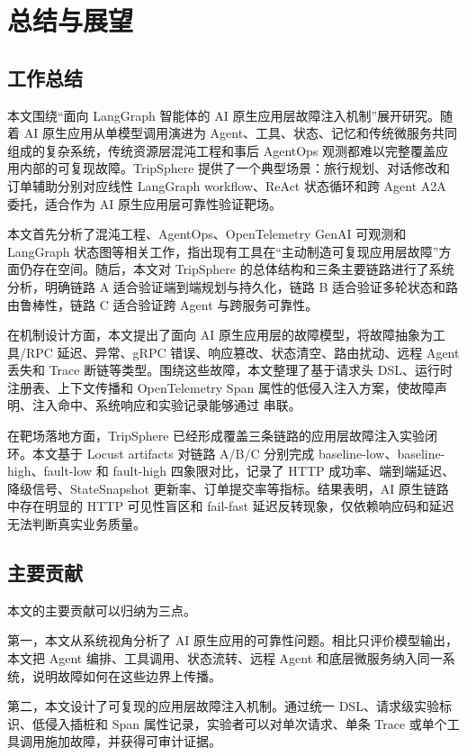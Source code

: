 \chapter{总结与展望}

\section{工作总结}

本文围绕“面向 LangGraph 智能体的 AI 原生应用层故障注入机制”展开研究。随着 AI 原生应用从单模型调用演进为 Agent、工具、状态、记忆和传统微服务共同组成的复杂系统，传统资源层混沌工程和事后 AgentOps 观测都难以完整覆盖应用内部的可复现故障。TripSphere 提供了一个典型场景：旅行规划、对话修改和订单辅助分别对应线性 LangGraph workflow、ReAct 状态循环和跨 Agent A2A 委托，适合作为 AI 原生应用层可靠性验证靶场。

本文首先分析了混沌工程、AgentOps、OpenTelemetry GenAI 可观测和 LangGraph 状态图等相关工作，指出现有工具在“主动制造可复现应用层故障”方面仍存在空间。随后，本文对 TripSphere 的总体结构和三条主要链路进行了系统分析，明确链路 A 适合验证端到端规划与持久化，链路 B 适合验证多轮状态和路由鲁棒性，链路 C 适合验证跨 Agent 与跨服务可靠性。

在机制设计方面，本文提出了面向 AI 原生应用层的故障模型，将故障抽象为工具/RPC 延迟、异常、gRPC 错误、响应篡改、状态清空、路由扰动、远程 Agent 丢失和 Trace 断链等类型。围绕这些故障，本文整理了基于请求头 DSL、运行时注册表、上下文传播和 OpenTelemetry Span 属性的低侵入注入方案，使故障声明、注入命中、系统响应和实验记录能够通过  串联。

在靶场落地方面，TripSphere 已经形成覆盖三条链路的应用层故障注入实验闭环。本文基于 Locust artifacts 对链路 A/B/C 分别完成 baseline-low、baseline-high、fault-low 和 fault-high 四象限对比，记录了 HTTP 成功率、端到端延迟、降级信号、StateSnapshot 更新率、订单提交率等指标。结果表明，AI 原生链路中存在明显的 HTTP 可见性盲区和 fail-fast 延迟反转现象，仅依赖响应码和延迟无法判断真实业务质量。

\section{主要贡献}

本文的主要贡献可以归纳为三点。

第一，本文从系统视角分析了 AI 原生应用的可靠性问题。相比只评价模型输出，本文把 Agent 编排、工具调用、状态流转、远程 Agent 和底层微服务纳入同一系统，说明故障如何在这些边界上传播。

第二，本文设计了可复现的应用层故障注入机制。通过统一 DSL、请求级实验标识、低侵入插桩和 Span 属性记录，实验者可以对单次请求、单条 Trace 或单个工具调用施加故障，并获得可审计证据。

